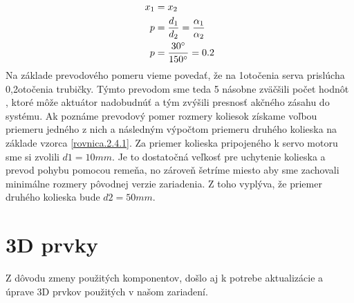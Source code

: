 \begin{align}
	\label{rovnica.2.4.2}
		x_1 &= x_2 \\
	p &=\frac{d_1}{d_2}=\frac{\alpha_1}{\alpha_2} \\
	p &=\frac{30\degree}{150\degree}=0.2
\end{align}
Na základe prevodového pomeru vieme povedať, že na 1\textdegree otočenia serva prislúcha 0,2\textdegree otočenia trubičky. Týmto prevodom sme teda 5 násobne zväčšili počet hodnôt , ktoré môže aktuátor nadobudnúť a tým zvýšili presnosť akčného zásahu do systému. 
Ak poznáme prevodový pomer rozmery koliesok získame voľbou priemeru jedného z nich a následným výpočtom priemeru druhého kolieska na základe vzorca \ref{rovnica.2.4.1}. Za priemer kolieska pripojeného k servo motoru sme si zvolili $d1 = 10 mm$. Je to dostatočná veľkosť pre uchytenie kolieska a prevod pohybu pomocou remeňa, no zároveň šetríme miesto aby sme zachovali minimálne rozmery pôvodnej verzie zariadenia. Z toho vyplýva, že priemer druhého kolieska bude $d2 = 50 mm$.  





\section{3D prvky}
\label{kap:2.5}

Z dôvodu zmeny použitých komponentov, došlo aj k potrebe aktualizácie a úprave 3D prvkov použitých v našom zariadení. 